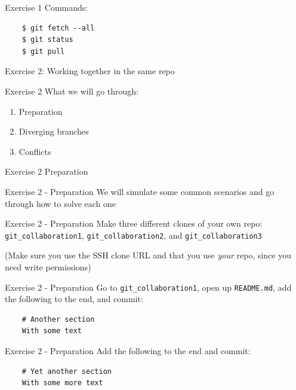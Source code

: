 \documentclass{beamer}
\newcommand{\fmtcmd}[1]{\texttt{#1}}
\begin{document}
\begin{frame}[fragile]{Exercise 1}
  Commands:

  \begin{verbatim}
    $ git fetch --all
    $ git status
    $ git pull
  \end{verbatim}
\end{frame}

\begin{frame}{}
  \center
  \Huge Exercise 2: Working together in the same repo
\end{frame}

\begin{frame}{Exercise 2}
  What we will go through:

  \begin{enumerate}
    \item Preparation
    \item Diverging branches
    \item Conflicts
  \end{enumerate}
\end{frame}

\begin{frame}{Exercise 2}
  \center
  \Huge Preparation
\end{frame}

\begin{frame}{Exercise 2 - Preparation}
  \center
  \LARGE We will simulate some common scenarios and go through how to
  solve each one
\end{frame}

\begin{frame}{Exercise 2 - Preparation}
  \center
  \Large Make three different clones of your own repo:
  \fmtcmd{git_collaboration1}, \fmtcmd{git_collaboration2}, and
  \fmtcmd{git_collaboration3}
  \pause

  \Large (Make sure you use the SSH clone URL and that you use
  \emph{your} repo, since you need write permissions)
\end{frame}

\begin{frame}[fragile]{Exercise 2 - Preparation}
  Go to \fmtcmd{git_collaboration1}, open up \fmtcmd{README.md}, add
  the following to the end, and commit:

  \begin{verbatim}
    # Another section
    With some text
  \end{verbatim}
\end{frame}

\begin{frame}[fragile]{Exercise 2 - Preparation}
  Add the following to the end and commit:
  \begin{verbatim}
    # Yet another section
    With some more text
  \end{verbatim}
\end{frame}
\end{document}
